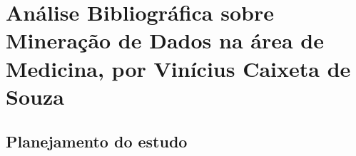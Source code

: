 \chapter{Análise Bibliográfica sobre Mineração de Dados na área de Medicina, por Vinícius Caixeta de Souza}

\section{Planejamento do estudo}

